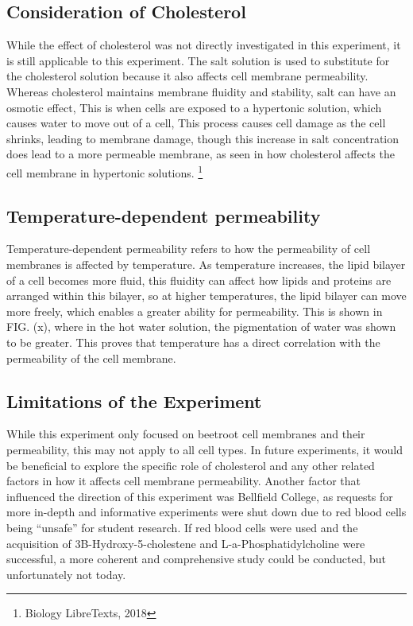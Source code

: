 \documentclass[a4paper,12pt,twoside,english]{all-in-one} %
\begin{document}
\subsection{Consideration of Cholesterol}
While the effect of cholesterol was not directly investigated in this experiment, it is still applicable to this experiment. The salt solution is used to substitute for the cholesterol solution because it also affects cell membrane permeability. Whereas cholesterol maintains membrane fluidity and stability, salt can have an osmotic effect, This is when cells are exposed to a hypertonic solution, which causes water to move out of a cell, This process causes cell damage as the cell shrinks, leading to membrane damage, though this increase in salt concentration does lead to a more permeable membrane, as seen in how cholesterol affects the cell membrane in hypertonic solutions. \footnote{Biology LibreTexts, 2018}

\subsection{Temperature-dependent permeability}
Temperature-dependent permeability refers to how the permeability of cell membranes is affected by temperature. As temperature increases, the lipid bilayer of a cell becomes more fluid, this fluidity can affect how lipids and proteins are arranged within this bilayer, so at higher temperatures, the lipid bilayer can move more freely, which enables a greater ability for permeability. This is shown in FIG. (x), where in the hot water solution, the pigmentation of water was shown to be greater. This proves that temperature has a direct correlation with the permeability of the cell membrane.

\subsection{Limitations of the Experiment}
While this experiment only focused on beetroot cell membranes and their permeability, this may not apply to all cell types. In future experiments, it would be beneficial to explore the specific role of cholesterol and any other related factors in how it affects cell membrane permeability. Another factor that influenced the direction of this experiment was Bellfield College, as requests for more in-depth and informative experiments were shut down due to red blood cells being “unsafe” for student research. If red blood cells were used and the acquisition of 3B-Hydroxy-5-cholestene and L-a-Phosphatidylcholine were successful, a more coherent and comprehensive study could be conducted, but unfortunately not today.
\end{document}
